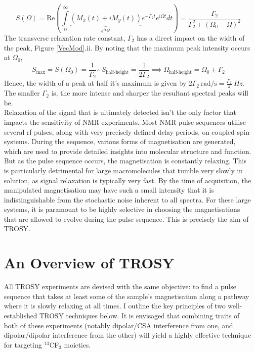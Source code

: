 \begin{equation}
S(\Omega) = \text{Re}\left(\int \limits_0^{\infty} \underbrace{(M_x(t) + iM_y(t))}_{e^{i\Omega_0 t}}e^{-\Gamma_2 t}e^{i \Omega t} dt \right) = \frac{\Gamma_2}{\Gamma_2^2 + (\Omega_0 - \Omega)^2}
\end{equation}
The transverse relaxation rate constant, $\Gamma_2$ has a direct impact on the width of the peak, Figure \ref{VecMod}.ii. By noting that the maximum peak intensity occurs at $\Omega_0$,
\begin{equation}
\label{eq1.4}
S_{\text{max}}=S(\Omega_0)=\frac{1}{\Gamma_2} \therefore\  S_{\text{half-height}} = \frac{1}{2\Gamma_2}  \implies \Omega_{\text{half-height}} = \Omega_0 \pm \Gamma_2
\end{equation}
Hence, the width of a peak at half it's maximum is given by $2\Gamma_2\ \si{\radian\per\second} = \frac{\Gamma_2}{\pi}\ \si{Hz}$. The smaller $\Gamma_2$ is, the more intense and sharper the resultant spectral peaks will be.\\
Relaxation of the signal that is ultimately detected isn't the only factor that impacts the sensitivity of NMR experiments. Most NMR pulse sequences utilise several rf pulses, along with very precisely defined delay periods, on coupled spin systems. During the sequence, various forms of magnetisation are generated, which are used to provide detailed insights into molecular structure and function. But as the pulse sequence occurs, the magnetisation is constantly relaxing. This is particularly detrimental for large macromolecules that tumble very slowly in solution, as signal relaxation is typically very fast. By the time of acquisition, the manipulated magnetisation may have such a small intensity that it is indistinguishable from the stochastic noise inherent to all spectra. For these large systems, it is paramount to be highly selective in choosing the magnetisations that are allowed to evolve during the pulse sequence. This is precisely the aim of TROSY.
\section{An Overview of TROSY}
All TROSY experiments are devised with the same objective: to find a pulse sequence that takes at least some of the sample's magnetisation along a pathway where it is slowly relaxing at all times. I outline the key principles of two well-established TROSY techniques below. It is envisaged that combining traits of both of these experiments (notably dipolar/CSA interference from one, and dipolar/dipolar interference from the other) will yield a highly effective technique for targeting $^{13}$CF$_3$ moieties.
